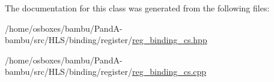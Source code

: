The documentation for this class was generated from the following files\+:\begin{DoxyCompactItemize}
\item 
/home/osboxes/bambu/\+Pand\+A-\/bambu/src/\+H\+L\+S/binding/register/\hyperlink{reg__binding__cs_8hpp}{reg\+\_\+binding\+\_\+cs.\+hpp}\item 
/home/osboxes/bambu/\+Pand\+A-\/bambu/src/\+H\+L\+S/binding/register/\hyperlink{reg__binding__cs_8cpp}{reg\+\_\+binding\+\_\+cs.\+cpp}\end{DoxyCompactItemize}
